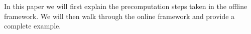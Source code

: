 In this paper we will first explain the precomputation steps taken in the offline framework. We will then walk through the online framework and provide a complete example.
%
%
%
%
%





